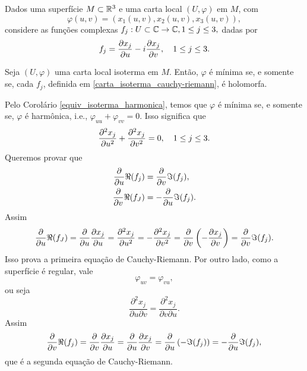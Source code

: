 Dados uma superfície $M \subset \mathbb{R}^3$ e uma carta local $(U, \varphi)$ em $M$, com
\begin{equation*}
\varphi(u,v) = (x_1(u,v), x_2(u,v), x_3(u,v)),
\end{equation*}
considere as funções complexas $f_j: U \subset \mathbb{C} \rightarrow \mathbb{C}, 1 \leq j \leq 3,$ dadas por
\begin{equation}\label{carta_isoterma_cauchy-riemann}
f_j = \frac{\partial x_j}{\partial u} - i \frac{\partial x_j}{\partial v}, \quad 1 \leq j \leq 3.
\end{equation}

\begin{lema}
	Seja $(U, \varphi)$ uma carta local isoterma em $M$. Então, $\varphi$ é mínima se, e somente se, cada $f_j$, definida em \eqref{carta_isoterma_cauchy-riemann}, é holomorfa.
\end{lema}

\begin{demonstracao}
	Pelo Corolário \ref{equiv_isoterma_harmonica}, temos que $\varphi$ é mínima se, e somente se, $\varphi$ é harmônica, i.e., $\varphi_{uu} + \varphi_{vv} = 0$. Isso significa que
	\begin{equation*}
	\frac{\partial^2 x_j}{\partial u^2} + \frac{\partial^2 x_j}{\partial v^2} = 0, \quad 1 \leq j \leq 3.
	\end{equation*}
	Queremos provar que
	\begin{align*}
	\frac{\partial}{\partial u} \Re(f_j) &= \frac{\partial}{\partial v} \Im(f_j),\\
	\frac{\partial}{\partial v} \Re(f_J) &= - \frac{\partial}{\partial u} \Im(f_j).
	\end{align*}
	Assim
	\begin{equation*}
	\frac{\partial}{\partial u} \Re(f_J) = \frac{\partial}{\partial u} \frac{\partial x_j}{\partial u} = \frac{\partial^2 x_j}{\partial u^2} = - \frac{\partial^2 x_j}{\partial v^2} = \frac{\partial}{\partial v} \left( - \frac{\partial x_j}{\partial v} \right) = \frac{\partial}{\partial v} \Im(f_j).
	\end{equation*}
	Isso prova a primeira equação de Cauchy-Riemann. Por outro lado, como a superfície é regular, vale
	\begin{equation*}
	\varphi_{uv} = \varphi_{vu},
	\end{equation*}
	ou seja
	\begin{equation*}
	\frac{\partial^2 x_j}{\partial u \partial v} = \frac{\partial^2 x_j}{\partial v \partial u}.
	\end{equation*}
	Assim
	\begin{equation*}
	\frac{\partial}{\partial v} \Re(f_j) = \frac{\partial}{\partial v} \frac{\partial x_j}{\partial u} = \frac{\partial}{\partial u} \frac{\partial x_j}{\partial v}
	= \frac{\partial}{\partial u} \left( - \Im(f_j) \right)
	= - \frac{\partial}{\partial u} \Im(f_j),
	\end{equation*}
	que é a segunda equação de Cauchy-Riemann.
\end{demonstracao}


